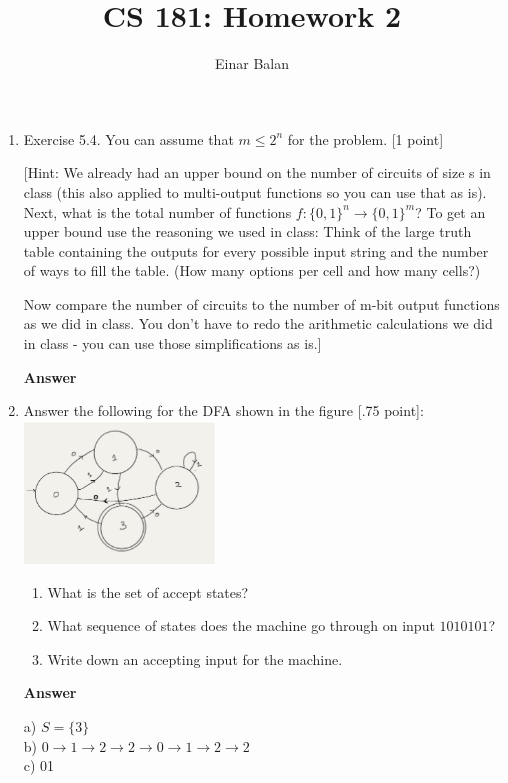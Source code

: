 \documentclass[11pt]{article}
\title{\bf{CS 181: Homework 2}}
\author{ Einar Balan}
\date{}
\newcommand \kw[1]{\textbf{#1}}
\newenvironment{answer}{
\vspace{.5cm}
\kw{Answer} 

}
{
\pagebreak
}
\begin{document}
\maketitle



\begin{enumerate}
\item Exercise 5.4. You can assume that $m \leq 2^n$ for the problem. [1 point]

[Hint: We already had an upper bound on the number of circuits of size s in class (this also applied to multi-output functions so you can use that as is). Next, what is the total number of functions $f:\{0,1\}^n \rightarrow \{0,1\}^m$? To get an upper bound use the reasoning we used in class: Think of the large truth table containing the outputs for every possible input string and the number of ways to fill the table. (How many options per cell and how many cells?)

Now compare the number of circuits to the number of m-bit output functions as we did in class. You don't have to redo the arithmetic calculations we did in class - you can use those simplifications as is.]

\begin{answer}
    
\end{answer}

\item Answer the following for the DFA shown in the figure [.75 point]:\\
\includegraphics[width=2in]{DFA.png}

\begin{enumerate}
\item What is the set of accept states?
\item What sequence of states does the machine go through on input $1010101$?
\item Write down an accepting input for the machine.
\end{enumerate}

\begin{answer}
    a) $S = \{3\}$ \\ 
    b) $0 \rightarrow 1 \rightarrow 2 \rightarrow 2 \rightarrow 0 \rightarrow 1 \rightarrow 2 \rightarrow 2$ \\ 
    c) 01
\end{answer}


\end{enumerate}
\end{document}
